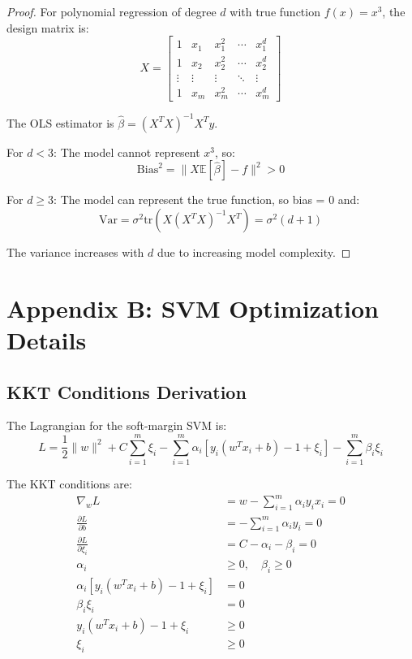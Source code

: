 \documentclass[12pt, a4paper]{article}
\begin{document}
\begin{proof}
For polynomial regression of degree $d$ with true function $f(x) = x^3$, the design matrix is:
\begin{equation}
X = \begin{bmatrix}
1 & x_1 & x_1^2 & \cdots & x_1^d \\
1 & x_2 & x_2^2 & \cdots & x_2^d \\
\vdots & \vdots & \vdots & \ddots & \vdots \\
1 & x_m & x_m^2 & \cdots & x_m^d
\end{bmatrix}
\end{equation}

The OLS estimator is $\hat{\beta} = (X^TX)^{-1}X^Ty$.

For $d < 3$: The model cannot represent $x^3$, so:
\begin{equation}
\text{Bias}^2 = \|X\mathbb{E}[\hat{\beta}] - f\|^2 > 0
\end{equation}

For $d \geq 3$: The model can represent the true function, so bias = 0 and:
\begin{equation}
\text{Var} = \sigma^2 \text{tr}(X(X^TX)^{-1}X^T) = \sigma^2(d+1)
\end{equation}

The variance increases with $d$ due to increasing model complexity.
\end{proof}

\section{Appendix B: SVM Optimization Details}

\subsection{KKT Conditions Derivation}

The Lagrangian for the soft-margin SVM is:
\begin{equation}
L = \frac{1}{2}\|w\|^2 + C\sum_{i=1}^m \xi_i - \sum_{i=1}^m \alpha_i[y_i(w^Tx_i + b) - 1 + \xi_i] - \sum_{i=1}^m \beta_i\xi_i
\end{equation}

The KKT conditions are:
\begin{align}
\nabla_w L &= w - \sum_{i=1}^m \alpha_i y_i x_i = 0 \\
\frac{\partial L}{\partial b} &= -\sum_{i=1}^m \alpha_i y_i = 0 \\
\frac{\partial L}{\partial \xi_i} &= C - \alpha_i - \beta_i = 0 \\
\alpha_i &\geq 0, \quad \beta_i \geq 0 \\
\alpha_i[y_i(w^Tx_i + b) - 1 + \xi_i] &= 0 \\
\beta_i\xi_i &= 0 \\
y_i(w^Tx_i + b) - 1 + \xi_i &\geq 0 \\
\xi_i &\geq 0
\end{align}
\end{document}
